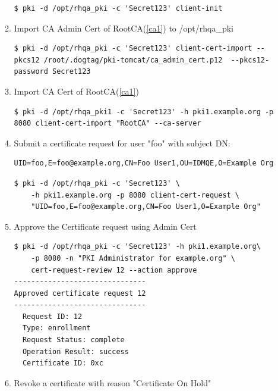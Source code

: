 \documentclass[a4paper]{article}
\begin{document}
\begin{enumerate}[label*=\arabic*.]
\begin{enumerate}[label*=\arabic*.]
\begin{lstlisting}[style=bashInputStyle]
$ pki -d /opt/rhqa_pki -c 'Secret123' client-init                                    
                    \end{lstlisting}
                \item \label{pki2} Import CA Admin Cert of RootCA(\ref{ca1}) to /opt/rhqa\_pki
                    \begin{lstlisting}[style=bashInputStyle]
$ pki -d /opt/rhqa_pki -c 'Secret123' client-cert-import --pkcs12 /root/.dogtag/pki-tomcat/ca_admin_cert.p12  --pkcs12-password Secret123                                    
                    \end{lstlisting}
                \item \label{pki3} Import CA Cert of RootCA(\ref{ca1})
                    \begin{lstlisting}[style=bashInputStyle]
$ pki -d /opt/rhqa_pki1 -c 'Secret123' -h pki1.example.org -p 8080 client-cert-import "RootCA" --ca-server                                    
                    \end{lstlisting}
                \item \label{pki4} Submit a certificate request for user "foo" with subject DN:
                    \begin{lstlisting}
UID=foo,E=foo@example.org,CN=Foo User1,OU=IDMQE,O=Example Org
                    \end{lstlisting}
                    \begin{lstlisting}[style=bashInputStyle]
$ pki -d /opt/rhqa_pki -c 'Secret123' \
    -h pki1.example.org -p 8080 client-cert-request \
    "UID=foo,E=foo@example.org,CN=Foo User1,O=Example Org" 
                    \end{lstlisting}
                \item \label{pki5} Approve the Certificate request using Admin Cert
                    \begin{lstlisting}[style=bashInputStyle]
$ pki -d /opt/rhqa_pki -c 'Secret123' -h pki1.example.org\
    -p 8080 -n "PKI Administrator for example.org" \
    cert-request-review 12 --action approve
-------------------------------
Approved certificate request 12
-------------------------------
  Request ID: 12
  Type: enrollment
  Request Status: complete
  Operation Result: success
  Certificate ID: 0xc
                    \end{lstlisting}
                \item Revoke a certificate with reason "Certificate On Hold"
                    \begin{lstlisting}[style=bashInputStyle]

\end{lstlisting}
\end{enumerate}
\end{enumerate}
\end{document}
